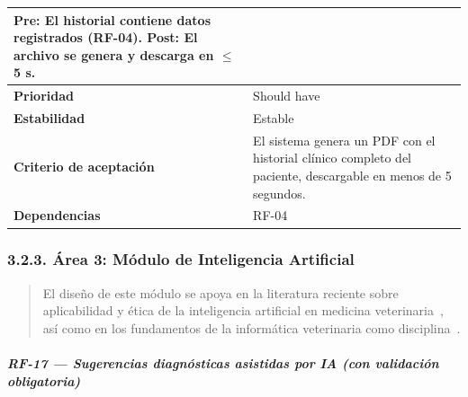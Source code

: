 \documentclass[
]{article}
\begin{document}
{\begin{longtable}[]{|
  >{\raggedright\arraybackslash}p{}|
  >{\raggedright\arraybackslash}p{}|}
\begin{minipage}[t]{\linewidth}
Pre: El historial contiene datos registrados (RF-04). Post: El archivo se genera y descarga en $\leq$5 s.
\end{minipage} \\
\hline
\textbf{Prioridad} & \begin{minipage}[t]{\linewidth}\raggedright
Should have
\end{minipage} \\
\hline
\textbf{Estabilidad} & \begin{minipage}[t]{\linewidth}\raggedright
Estable
\end{minipage} \\
\hline
\textbf{Criterio de aceptación} &
\begin{minipage}[t]{\linewidth}\raggedright
El sistema genera un PDF con el historial clínico completo del paciente, descargable en menos de 5 segundos.
\end{minipage} \\
\hline
\textbf{Dependencias} & \begin{minipage}[t]{\linewidth}\raggedright
RF-04
\end{minipage} \\
\hline
\end{longtable}
}

\subsubsection{3.2.3. Área 3: Módulo de Inteligencia Artificial}\label{area-3-modulo-ia}

\begin{quote}
El diseño de este módulo se apoya en la literatura reciente sobre
aplicabilidad y ética de la inteligencia artificial en medicina
veterinaria~\cite{bouchemla2023,owens2023,coghlan2024}, así como en los
fundamentos de la informática veterinaria como disciplina~\cite{lustgarten2020}.
\end{quote}

\subparagraph{RF-17 --- Sugerencias diagnósticas asistidas por IA (con validación obligatoria)}\label{rf-17-sugerencias-diagn-sticas-asistidas-por-i}
\end{document}
